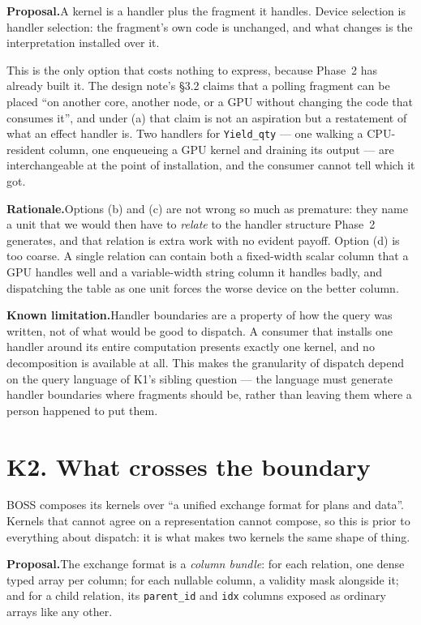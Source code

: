 \documentclass[11pt,a4paper]{article}
\newcommand{\rationale}[1]{%
  \par\noindent\textbf{Rationale.}\quad #1\par\medskip}
\newcommand{\limitation}[1]{%
  \par\noindent\textbf{Known limitation.}\quad #1\par\medskip}
\newcommand{\proposal}[1]{%
  \par\medskip\noindent\textcolor{open}{\textbf{Proposal.}}\quad #1\par\medskip}
\begin{document}
\proposal{A kernel is a handler plus the fragment it handles. Device
selection is handler selection: the fragment's own code is unchanged, and what
changes is the interpretation installed over it.}

This is the only option that costs nothing to express, because Phase~2 has
already built it. The design note's §3.2 claims that a polling fragment can be
placed ``on another core, another node, or a GPU without changing the code that
consumes it'', and under (a) that claim is not an aspiration but a restatement
of what an effect handler is. Two handlers for \texttt{Yield\_qty} --- one
walking a CPU-resident column, one enqueueing a GPU kernel and draining its
output --- are interchangeable at the point of installation, and the consumer
cannot tell which it got.

\rationale{Options (b) and (c) are not wrong so much as premature: they name a
unit that we would then have to \emph{relate} to the handler structure Phase~2
generates, and that relation is extra work with no evident payoff. Option (d)
is too coarse. A single relation can contain both a fixed-width scalar column
that a GPU handles well and a variable-width string column it handles badly,
and dispatching the table as one unit forces the worse device on the better
column.}

\limitation{Handler boundaries are a property of how the query was written,
not of what would be good to dispatch. A consumer that installs one handler
around its entire computation presents exactly one kernel, and no
decomposition is available at all. This makes the granularity of dispatch
depend on the query language of K1's sibling question --- the language must
generate handler boundaries where fragments should be, rather than leaving
them where a person happened to put them.}

\section{K2. What crosses the boundary}

BOSS composes its kernels over ``a unified exchange format for plans and
data''. Kernels that cannot agree on a representation cannot compose, so this
is prior to everything about dispatch: it is what makes two kernels the same
shape of thing.

\proposal{The exchange format is a \emph{column bundle}: for each relation, one
dense typed array per column; for each nullable column, a validity mask
alongside it; and for a child relation, its \texttt{parent\_id} and
\texttt{idx} columns exposed as ordinary arrays like any other.}
\end{document}
